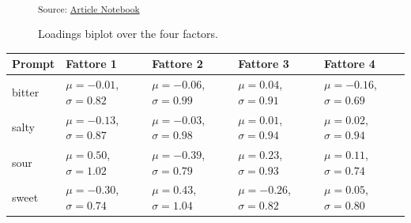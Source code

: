 \documentclass[
  letterpaper,
  DIV=11,
  numbers=noendperiod]{scrartcl}
\begin{document}
\begin{figure}
\begin{minipage}{0.50\linewidth}
{\textsubscript{Source:
\href{https://matteospanio.github.io/multimodal-symphony-survey-analysis/index.qmd.html}{Article
Notebook}}

}

\subcaption{\label{fig-fa-biplot-4}}

\end{minipage}%

\caption{\label{fig-fa-biplot}Loadings biplot over the four factors.}

\end{figure}%

\begin{longtable}[]{@{}
  >{\raggedright\arraybackslash}p{}
  >{\raggedright\arraybackslash}p{}
  >{\raggedright\arraybackslash}p{}
  >{\raggedright\arraybackslash}p{}
  >{\raggedright\arraybackslash}p{}@{}}
\toprule\noalign{}
\begin{minipage}[b]{\linewidth}\raggedright
Prompt
\end{minipage} & \begin{minipage}[b]{\linewidth}\raggedright
Fattore 1
\end{minipage} & \begin{minipage}[b]{\linewidth}\raggedright
Fattore 2
\end{minipage} & \begin{minipage}[b]{\linewidth}\raggedright
Fattore 3
\end{minipage} & \begin{minipage}[b]{\linewidth}\raggedright
Fattore 4
\end{minipage} \\
\midrule\noalign{}
\endhead
\bottomrule\noalign{}
\endlastfoot
bitter & \(\mu=-0.01\), \(\sigma=0.82\) & \(\mu=-0.06\), \(\sigma=0.99\)
& \(\mu=0.04\), \(\sigma=0.91\) & \(\mu=-0.16\), \(\sigma=0.69\) \\
salty & \(\mu=-0.13\), \(\sigma=0.87\) & \(\mu=-0.03\), \(\sigma=0.98\)
& \(\mu=0.01\), \(\sigma=0.94\) & \(\mu=0.02\), \(\sigma=0.94\) \\
sour & \(\mu=0.50\), \(\sigma=1.02\) & \(\mu=-0.39\), \(\sigma=0.79\) &
\(\mu=0.23\), \(\sigma=0.93\) & \(\mu=0.11\), \(\sigma=0.74\) \\
sweet & \(\mu=-0.30\), \(\sigma=0.74\) & \(\mu=0.43\), \(\sigma=1.04\) &
\(\mu=-0.26\), \(\sigma=0.82\) & \(\mu=0.05\), \(\sigma=0.80\) \\
\end{longtable}
\end{document}
